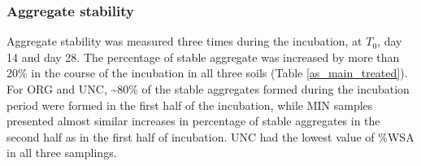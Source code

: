 		


		\subsubsection{Aggregate stability}

		Aggregate stability was measured three times during the incubation, at $ T_0 $, day 14 and day 28. The percentage of stable aggregate was increased by more than 20\% in the course of the incubation in all three soils (Table \ref{as_main_treated}). For ORG and UNC, \~{}80\% of the stable aggregates formed during the incubation period were formed in the first half of the incubation, while MIN samples presented almost similar increases in percentage of stable aggregates in the second half as in the first half of incubation. UNC had the lowest value of \%WSA in all three samplings.\\

		


%

